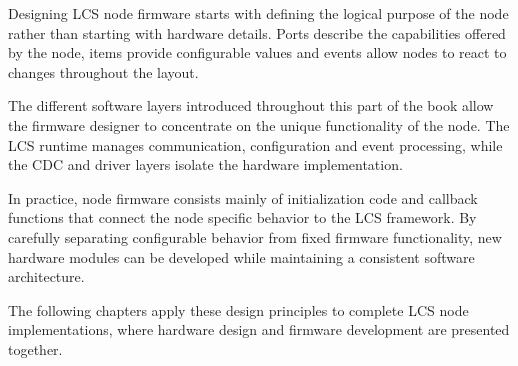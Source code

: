 
Designing LCS node firmware starts with defining the logical purpose of the
node rather than starting with hardware details. Ports describe the capabilities
offered by the node, items provide configurable values and events allow nodes to
react to changes throughout the layout.

The different software layers introduced throughout this part of the book allow
the firmware designer to concentrate on the unique functionality of the node.
The LCS runtime manages communication, configuration and event processing, while
the CDC and driver layers isolate the hardware implementation.

In practice, node firmware consists mainly of initialization code and callback
functions that connect the node specific behavior to the LCS framework. By
carefully separating configurable behavior from fixed firmware functionality,
new hardware modules can be developed while maintaining a consistent software
architecture.

The following chapters apply these design principles to complete LCS node
implementations, where hardware design and firmware development are presented
together.